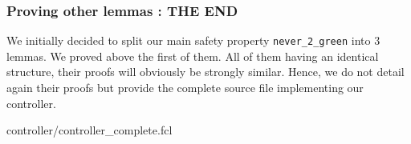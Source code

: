 \subsubsection{Proving other lemmas : THE END}
We initially decided to split our main safety property
\lstinline"never_2_green" into 3 lemmas. We proved above the first of
them. All of them having an identical structure, their proofs will
obviously be strongly similar. Hence, we do not detail again their
proofs but provide the complete source file implementing our
controller.

{\scriptsize
 {controller/controller_complete.fcl}}
